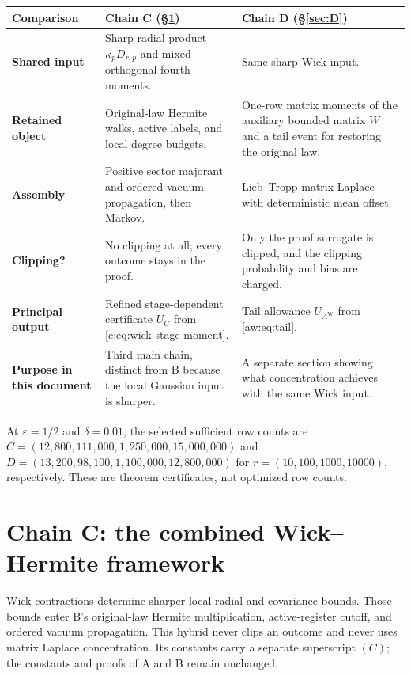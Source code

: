 \documentclass[11pt]{article}
\numberwithin{equation}{section}
\theoremstyle{definition}\newtheorem{definition}[theorem]{Definition}
\theoremstyle{remark}\newtheorem{remark}[theorem]{Remark}
\begin{document}
\begin{center}
{\begin{minipage}{\textwidth}
\vspace{2mm}
\begingroup\fontsize{9.2}{11.2}\selectfont
\setlength{\tabcolsep}{5pt}\renewcommand{\arraystretch}{1.12}
\begin{tabularx}{\textwidth}{@{}P{.18\textwidth}YY@{}}
\toprule
\textbf{Comparison}&{\color{Amber!90!black}\textbf{Chain C} (\S\ref{sec:C})}&{\color{Teal}\textbf{Chain D} (\S\ref{sec:D})}\\
\midrule
{}
\textbf{Shared input}&Sharp radial product $\kappa_pD_{r,p}$ and mixed orthogonal fourth moments.&Same sharp Wick input.\\[3pt]
\textbf{Retained object}&Original-law Hermite walks, active labels, and local degree budgets.&One-row matrix moments of the auxiliary bounded matrix $W$ and a tail event for restoring the original law.\\[3pt]
\textbf{Assembly}&Positive sector majorant and ordered vacuum propagation, then Markov.&Lieb--Tropp matrix Laplace with deterministic mean offset.\\[3pt]
\textbf{Clipping?}&No clipping at all; every outcome stays in the proof.&Only the proof surrogate is clipped, and the clipping probability and bias are charged.\\[3pt]
\textbf{Principal output}&Refined stage-dependent certificate $U_C$ from \eqref{c:eq:wick-stage-moment}.&Tail allowance $U_{A^{\mathrm W}}$ from \eqref{aw:eq:tail}.\\[3pt]
\textbf{Purpose in this document}&Third main chain, distinct from B because the local Gaussian input is sharper.&A separate section showing what concentration achieves with the same Wick input.\\
\bottomrule
\end{tabularx}
\endgroup

\vspace{2mm}
{\small At $\varepsilon=1/2$ and $\delta=0.01$, the selected sufficient row counts are $C=(12{,}800,111{,}000,1{,}250{,}000,15{,}000{,}000)$ and $D=(13{,}200,98{,}100,1{,}100{,}000,12{,}800{,}000)$ for $r=(10,100,1000,10000)$, respectively. These are theorem certificates, not optimized row counts.}
\end{minipage}%
}
\end{center}
\section{Chain C: the combined Wick--Hermite framework}\label{sec:C}
\begin{takeaway}[colframe=Amber!80,coltitle=Amber,title={A third proof chain, not a replacement for B}]
Wick contractions determine sharper local radial and covariance bounds.
Those bounds enter B's original-law Hermite multiplication, active-register
cutoff, and ordered vacuum propagation. This hybrid never clips an outcome and
never uses matrix Laplace concentration. Its constants carry a separate
superscript $(C)$; the constants and proofs of A and B remain unchanged.
\end{takeaway}
\end{document}
